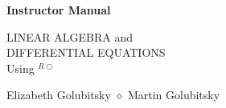 \parindent=0in
\marginparwidth=0.33in

\newcommand{\exer}[1]{\paragraph\noindent\hspace*{-0.186in}\ifodd\value{page}\reversemarginpar\else\normalmarginpar\fi\marginpar{\bf\ref{#1}.}}

\def\tm{{\ooalign{\hfil\raise.15ex\hbox{\tiny R}\hfil\crcr\mathhexbox20D}}}

\newcommand{\trademark}{{R\!\!\!\!\!\bigcirc}}

%
 
 
 
 



 

%


\makeindex


 



\setcounter{page}{0}

\vspace*{1.0in} 

\Huge

\begin{center}

{\bf Instructor Manual}

\vspace{1.5in} 

\huge

LINEAR ALGEBRA and \\
DIFFERENTIAL EQUATIONS \\
Using \protect{\Matlabp}$^\trademark$
 
\vspace{2.0in}

 
Elizabeth Golubitsky \quad $\diamond$ \quad Martin Golubitsky
\end{center}
\normalsize

